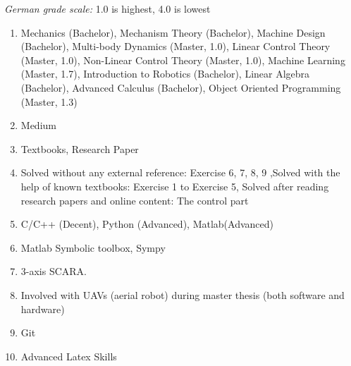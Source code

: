 \emph{German grade scale:} 1.0 is highest, 4.0 is lowest
\begin{enumerate}
	\item Mechanics (Bachelor), Mechanism Theory (Bachelor), Machine Design (Bachelor), Multi-body Dynamics (Master, 1.0), Linear Control Theory (Master, 1.0), Non-Linear Control Theory (Master, 1.0), Machine Learning (Master, 1.7), Introduction to Robotics (Bachelor), Linear Algebra (Bachelor), Advanced Calculus (Bachelor), Object Oriented Programming (Master, 1.3)
	\item Medium
	\item Textbooks, Research Paper
	\item Solved without any external reference: Exercise 6, 7, 8, 9 ,Solved with the help of known textbooks: Exercise 1 to Exercise 5, Solved after reading research papers and online content: The control part
	\item C/C++ (Decent), Python (Advanced), Matlab(Advanced)
	\item Matlab Symbolic toolbox, Sympy
	\item 3-axis SCARA.
	\item Involved with UAVs (aerial robot) during master thesis (both software and hardware)
	\item Git 
	\item Advanced Latex Skills
\end{enumerate}
